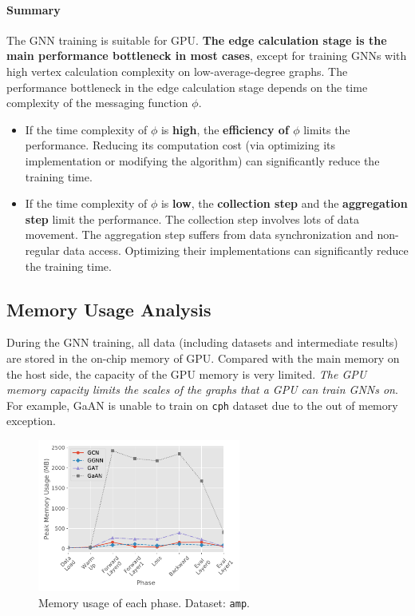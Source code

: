 \paragraph{Summary}
The GNN training is suitable for GPU.
\textbf{The edge calculation stage is the main performance bottleneck in most cases}, except for training GNNs with high vertex calculation complexity on low-average-degree graphs.
The performance bottleneck in the edge calculation stage depends on the time complexity of the messaging function $\phi$.
\begin{itemize}
    \item If the time complexity of $\phi$ is \textbf{high}, the \textbf{efficiency of $\phi$} limits the performance. Reducing its computation cost (via optimizing its implementation or modifying the algorithm) can significantly reduce the training time.
    \item If the time complexity of $\phi$ is \textbf{low}, the \textbf{collection step} and the \textbf{aggregation step} limit the performance. The collection step involves lots of data movement. The aggregation step suffers from data synchronization and non-regular data access. Optimizing their implementations can significantly reduce the training time.
\end{itemize}

\subsection{Memory Usage Analysis}
\label{sec:memory_usage_analysis}

During the GNN training, all data (including datasets and intermediate results) are stored in the on-chip memory of GPU.
Compared with the main memory on the host side, the capacity of the GPU memory is very limited.
\emph{The GPU memory capacity limits the scales of the graphs that a GPU can train GNNs on}.
For example, GaAN is unable to train on \texttt{cph} dataset due to the out of memory exception.

\begin{figure}[tbp]
    \centering
    \includegraphics[height=5cm]{figs/experiments/exp_memory_usage_stage_amp.pdf}
    \caption{Memory usage of each phase. Dataset: \texttt{amp}.}
    \label{fig:exp_memory_usage_stage_amp}
\end{figure}

